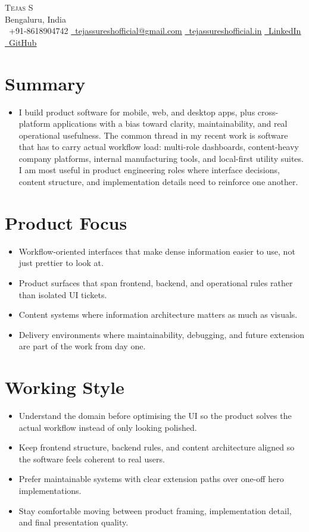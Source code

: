 \documentclass[letterpaper,11pt]{article}
\newcommand{\resumeItem}[1]{\item\small{{#1 \vspace{-1pt}}}}
\newcommand{\resumeSubHeadingListStart}{\begin{itemize}[leftmargin=0.0in, label={}]}
\newcommand{\resumeSubHeadingListEnd}{\end{itemize}}
\begin{document}
\begin{center}
  {\Huge \scshape Tejas S}\\[-2pt]
  {\small Bengaluru, India}\\[3pt]
  {\small
    \faPhone\ +91-8618904742 \quad
    \href{mailto:tejassureshofficial@gmail.com}{\faEnvelope\ \underline{tejassureshofficial@gmail.com}} \quad
    \href{https://tejassureshofficial.in}{\faGlobe\ \underline{tejassureshofficial.in}} \quad
    \href{https://www.linkedin.com/in/tejas-s-57138816a/}{\faLinkedin\ \underline{LinkedIn}} \quad
    \href{https://github.com/Tez861910}{\faGithub\ \underline{GitHub}}
  }
\end{center}
\vspace{-8pt}

\section{Summary}
\resumeSubHeadingListStart
  \resumeItem{I build product software for mobile, web, and desktop apps, plus cross-platform applications with a bias toward clarity, maintainability, and real operational usefulness. The common thread in my recent work is software that has to carry actual workflow load: multi-role dashboards, content-heavy company platforms, internal manufacturing tools, and local-first utility suites. I am most useful in product engineering roles where interface decisions, content structure, and implementation details need to reinforce one another.}
\resumeSubHeadingListEnd
\vspace{-10pt}

\section{Product Focus}
\resumeSubHeadingListStart
  \resumeItem{Workflow-oriented interfaces that make dense information easier to use, not just prettier to look at.}
  \resumeItem{Product surfaces that span frontend, backend, and operational rules rather than isolated UI tickets.}
  \resumeItem{Content systems where information architecture matters as much as visuals.}
  \resumeItem{Delivery environments where maintainability, debugging, and future extension are part of the work from day one.}
\resumeSubHeadingListEnd
\vspace{-10pt}

\section{Working Style}
\resumeSubHeadingListStart
  \resumeItem{Understand the domain before optimising the UI so the product solves the actual workflow instead of only looking polished.}
  \resumeItem{Keep frontend structure, backend rules, and content architecture aligned so the software feels coherent to real users.}
  \resumeItem{Prefer maintainable systems with clear extension paths over one-off hero implementations.}
  \resumeItem{Stay comfortable moving between product framing, implementation detail, and final presentation quality.}
\resumeSubHeadingListEnd
\vspace{-10pt}
\end{document}
